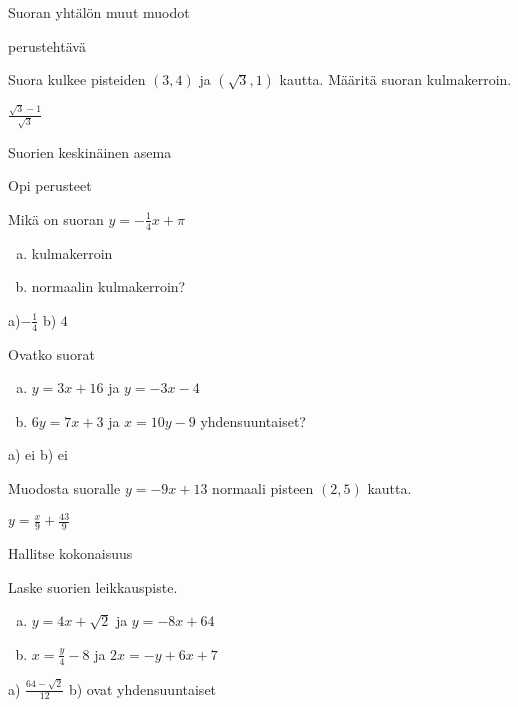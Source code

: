 Suoran yhtälön muut muodot

perustehtävä

\begin {tehtava}
Suora kulkee pisteiden $(3,4)$ ja $(\sqrt{3},1)$ kautta. Määritä suoran kulmakerroin.
\begin {vastaus}
$\frac{\sqrt{3}-1}{\sqrt{3}}$
\end {vastaus}
\end {tehtava}

Suorien keskinäinen asema

Opi perusteet

\begin {tehtava}
Mikä on suoran $y=-\frac{1}{4}x+\pi$
\begin{enumerate} [a)]
\item kulmakerroin
\item normaalin kulmakerroin?
\end{enumerate}
\begin {vastaus}
a)$-\frac{1}{4}$  b) $4$ 
\end {vastaus}
\end {tehtava}

\begin {tehtava}
Ovatko suorat 
\begin{enumerate} [a)]
\item $y=3x+16$ ja $y=-3x-4$
\item $6y=7x+3$ ja $x=10y-9$ yhdensuuntaiset?
\end{enumerate}
\begin {vastaus}
a) ei b) ei
\end {vastaus}
\end {tehtava}

\begin {tehtava}
Muodosta suoralle $y=-9x+13$ normaali pisteen $(2,5)$ kautta.
\begin {vastaus}
$y=\frac{x}{9}+\frac{43}{9}$
\end {vastaus}
\end {tehtava}

Hallitse kokonaisuus

\begin {tehtava}
Laske suorien leikkauspiste.
\begin{enumerate} [a)]
\item $y=4x+\sqrt{2}$ ja $y=-8x+64$
\item $x=\frac{y}{4}-8$ ja $2x=-y+6x+7$
\end{enumerate}
\begin {vastaus}
a) $\frac{64-\sqrt{2}}{12}$ b) ovat yhdensuuntaiset
\end {vastaus}
\end {tehtava}

